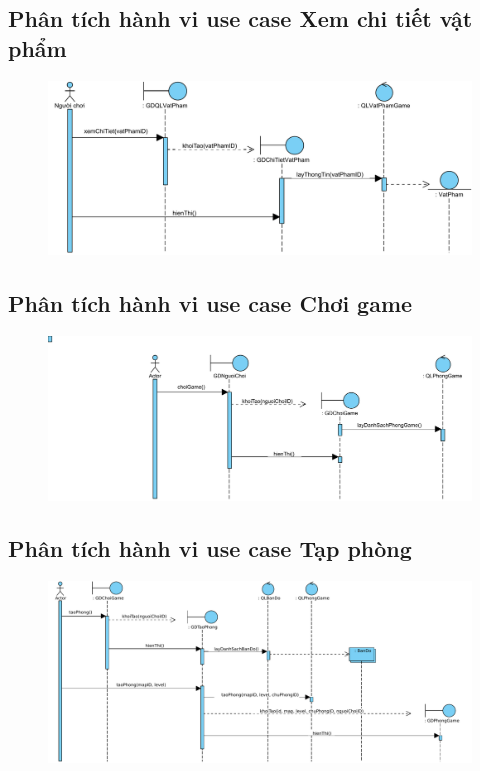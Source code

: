 \documentclass[3p]{elsarticle}
\begin{document}
\subsection{Phân tích hành vi use case Xem chi tiết vật phẩm}
\begin{figure}[!htbp]
	\hspace*{-.5in}
	\centering
	\includegraphics[scale=.55]{images/sequence-pdfs/gamer/ItemManagement_ViewDetail.pdf}
\end{figure}
\newpage

\subsection{Phân tích hành vi use case Chơi game}
\begin{figure}[!htbp]
	\hspace*{-.5in}
	\centering
	\includegraphics[scale=.55]{images/sequence-pdfs/gamer/PlayGame.pdf}
\end{figure}
\newpage

\subsection{Phân tích hành vi use case Tạp phòng}
\begin{figure}[!htbp]
	\hspace*{-.5in}
	\centering
	\includegraphics[scale=.45]{images/sequence-pdfs/gamer/PlayGame_CreateRoom.pdf}
\end{figure}
\newpage
\end{document}
